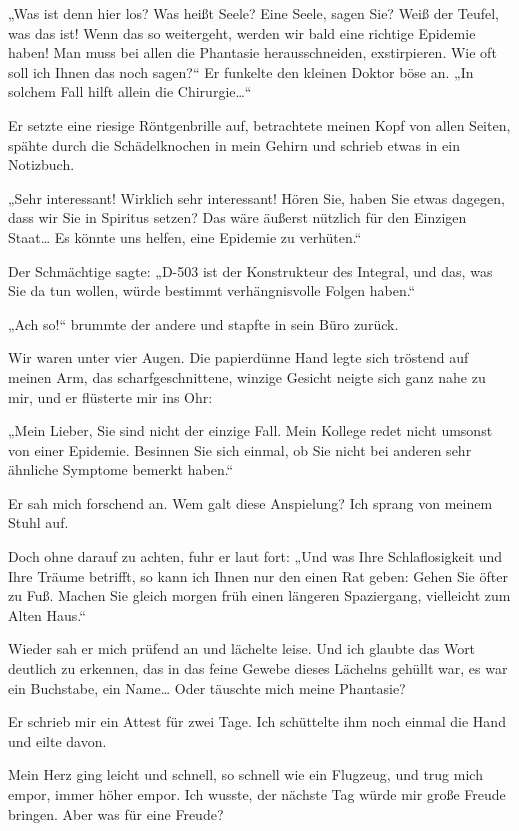 „Was ist denn hier los? Was heißt Seele? Eine Seele, sagen Sie?
Weiß der Teufel, was das ist! Wenn das so weitergeht, werden wir
bald eine richtige Epidemie haben! Man muss bei allen die Phantasie
herausschneiden, exstirpieren. Wie oft soll ich Ihnen das noch
sagen?“ Er funkelte den kleinen Doktor böse an. „In solchem Fall
hilft allein die Chirurgie\ldots{}“

Er setzte eine riesige Röntgenbrille auf, betrachtete meinen Kopf
von allen Seiten, spähte durch die Schädelknochen in mein Gehirn
und schrieb etwas in ein Notizbuch.

„Sehr interessant! Wirklich
sehr interessant! Hören Sie, haben Sie etwas dagegen, dass wir Sie
in Spiritus setzen? Das wäre äußerst nützlich für den Einzigen
Staat\ldots{} Es könnte uns helfen, eine Epidemie zu verhüten.“

Der
Schmächtige sagte: „D-503 ist der Konstrukteur des Integral, und
das, was Sie da tun wollen, würde bestimmt verhängnisvolle Folgen
haben.“

„Ach so!“ brummte der andere und stapfte in sein Büro zurück.

Wir waren unter vier Augen. Die papierdünne Hand legte sich
tröstend auf meinen Arm, das scharfgeschnittene, winzige Gesicht
neigte sich ganz nahe zu mir, und er flüsterte mir ins Ohr:

„Mein Lieber, Sie sind nicht der einzige Fall. Mein Kollege redet
nicht umsonst von einer Epidemie. Besinnen Sie sich einmal, ob Sie
nicht bei anderen sehr ähnliche Symptome bemerkt haben.“

Er sah mich forschend an. Wem galt diese Anspielung? Ich sprang von
meinem Stuhl auf.

Doch ohne darauf zu achten, fuhr er laut fort: „Und was Ihre
Schlaflosigkeit und Ihre Träume betrifft, so kann ich Ihnen nur den
einen Rat geben: Gehen Sie öfter zu Fuß. Machen Sie gleich morgen
früh einen längeren Spaziergang, vielleicht zum Alten Haus.“

Wieder sah er mich prüfend an und lächelte leise. Und ich glaubte
das Wort deutlich zu erkennen, das in das feine Gewebe dieses
Lächelns gehüllt war, es war ein Buchstabe, ein Name\ldots{} Oder
täuschte mich meine Phantasie?

Er schrieb mir ein Attest für zwei
Tage. Ich schüttelte ihm noch einmal die Hand und eilte davon.

Mein
Herz ging leicht und schnell, so schnell wie ein Flugzeug, und trug
mich empor, immer höher empor. Ich wusste, der nächste Tag würde
mir große Freude bringen. Aber was für eine Freude?

